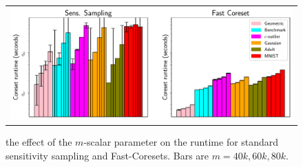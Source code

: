 \begin{figure}
\centering
\begin{tabular}{c}
    \includegraphics[width=.95\linewidth]{images/2/coreset_runtime-Effect_of_k_for_sens_sampling.pdf}
\end{tabular}
\caption{the effect of the $m$-scalar parameter on the runtime for standard sensitivity sampling and Fast-Coresets. Bars are $m=40k, 60k, 80k$.}
\label{fig:coreset_size_on_sens_quality}
\end{figure}

